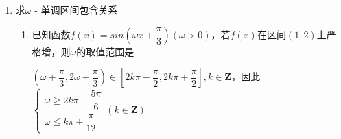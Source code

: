 \begin{enumerate}
\begin{enumerate}
    \item 已知 $f\left( x\right)  = 2\cos \left( {{\omega x} + \dfrac{3\pi }{4}}\right)$ ，其中 $\omega  > 0$，若 $f\left( \dfrac{\pi }{4}\right)  = 0$ ，且函数 $y = f\left( x\right)$ 在 $\left( {\dfrac{\pi }{4},\dfrac{\pi }{3}}\right)$ 内有极小值，但无极大值，求 $\omega$ 的值.
    \begin{jieda}
        $\omega \cdot \dfrac{\pi }{4} + \dfrac{3\pi }{4} = {2k\pi } + \dfrac{\pi }{2},k \in  \mathbf{Z}$ ,可得 $\omega  = {8k} - 1,k \in  \mathbf{Z}$
        
        $\left\{  \begin{array}{l} \dfrac{\pi }{4} + \dfrac{1}{4}T < \dfrac{\pi }{3} \\  \dfrac{\pi }{4} + \dfrac{3}{4}T \geq  \dfrac{\pi }{3} \end{array}\right.$ ，所以 $\left\{  \begin{array}{l} \dfrac{\pi }{4} + \dfrac{1}{4} \cdot  \dfrac{2\pi }{\omega } < \dfrac{\pi }{3} \\  \dfrac{\pi }{4} + \dfrac{3}{4} \cdot  \dfrac{2\pi }{\omega } \geq  \dfrac{\pi }{3} \end{array}\right.$ ，即 $6 < \omega  \leq  {18}$  
        
        因此$\omega  = 7$ 或 $15$.
    \end{jieda}
\end{enumerate}

\item 求$\omega$ - 单调区间包含关系
\begin{enumerate}
    \item 已知函数$f(x) = sin\left(\omega x + \dfrac{\pi}{3}\right) (\omega > 0)$，若$f(x)$在区间$(1,2)$上严格增，则$\omega$的取值范围是\blkda{$\left(0, \dfrac{\pi}{12}\right]$}
        \begin{jieda}
            $\left(\omega + \dfrac{\pi}{3}, 2\omega+\dfrac{\pi}{3}\right) \in \left[2k\pi - \dfrac{\pi}{2}, 2k\pi + \dfrac{\pi}{2}\right], k \in \mathbf{Z}$，因此$\left \{ \begin{array}{l}
            \omega \geq 2k\pi - \dfrac{5\pi}{6} \\
            \omega \leq k\pi + \dfrac{\pi}{12} 
            \end{array}\right . (k \in \mathbf{Z})$
            

\end{jieda}
\end{enumerate}
\end{enumerate}
